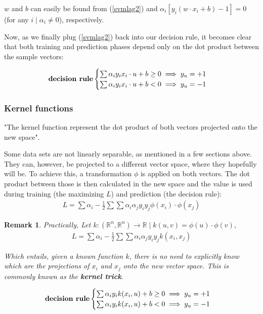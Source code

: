\documentclass[12pt]{report}
\newtheorem{remark}{Remark}[section]
\begin{document}
$w$ and $b$ can easily be found from (\ref{svmlag2}) and $\alpha_i[y_i(w \cdot x_i + b) - 1] = 0$ (for any $i \mid \alpha_i \ne 0$), respectively.

Now, as we finally plug (\ref{svmlag2}) back into our decision rule, it becomes clear that both training and prediction phases depend only on the dot product between the sample vectors: \cite{mitsvm}

$$\text{\textbf{decision rule}} \begin{cases}
	\sum\alpha_i y_i x_i \cdot u +b \geq 0 \implies y_u=+1\\
	\sum\alpha_i y_i x_i \cdot u +b < 0 \implies y_u=-1\\
\end{cases}$$

\subsubsection{Kernel functions}

"The kernel function represent the dot product of both vectors projected onto the new space". \cite{mitsvm}

Some data sets are not linearly separable, as mentioned in a few sections above. They can, however, be projected to a different vector space, where they hopefully will be. To achieve this, a transformation $\phi$ is applied on both vectors. The dot product between those is then calculated in the new space and the value is used during training (the maximizing $L$) and prediction (the decision rule):
\begin{gather*}
L = \sum\alpha_i -\frac{1}{2}\sum\sum\alpha_i\alpha_j y_i y_j \phi(x_i) \cdot \phi(x_j)
\end{gather*}

\begin{remark}
	Practically, Let $k: (\mathbb{R}^n, \mathbb{R}^n) \rightarrow \mathbb{R} \mid k(u, v) = \phi(u) \cdot \phi(v)$,
	\begin{gather*}
	L = \sum\alpha_i -\frac{1}{2}\sum\sum\alpha_i\alpha_j y_i y_j k(x_i, x_j)
	\end{gather*}

	Which entails, given a known function $k$, there is no need to explicitly know which are the projections of $x_i$ and $x_j$ onto the new vector space. This is commonly known as the \textbf{kernel trick}.
\end{remark}

$$\text{\textbf{decision rule}} \begin{cases}
\sum\alpha_i y_i k(x_i, u) +b \geq 0 \implies y_u=+1\\
\sum\alpha_i y_i k(x_i, u) +b < 0 \implies y_u=-1\\
\end{cases}$$
\end{document}
